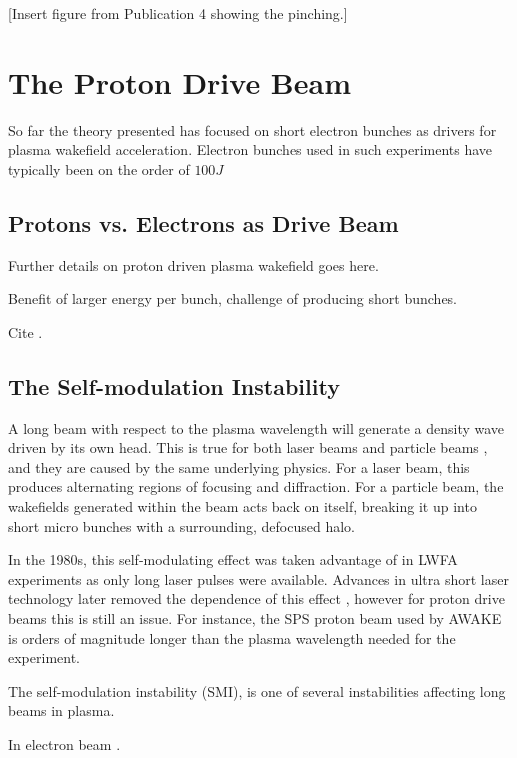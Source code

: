 [Insert figure from Publication 4 showing the pinching.]

\section{The Proton Drive Beam}
\label{Int:DBeam}

So far the theory presented has focused on short electron bunches as drivers for plasma wakefield acceleration. Electron bunches used in such experiments have typically been on the order of $100\unit{J}$

\subsection{Protons vs. Electrons as Drive Beam}
\label{Int:DBeam:PDPWFA}

Further details on proton driven plasma wakefield goes here.

Benefit of larger energy per bunch, challenge of producing short bunches.

Cite \cite{adli:2016a}.

\subsection{The Self-modulation Instability}
\label{Int:DBeam:SMI}

A long beam with respect to the plasma wavelength will generate a density wave driven by its own head. This is true for both laser beams \cite{esarey:1994} and particle beams \cite{kumar:2010}, and they are caused by the same underlying physics. For a laser beam, this produces alternating regions of focusing and diffraction. For a particle beam, the wakefields generated within the beam acts back on itself, breaking it up into short micro bunches with a surrounding, defocused halo.

In the 1980s, this self-modulating effect was taken advantage of in LWFA experiments as only long laser pulses were available. Advances in ultra short laser technology later removed the dependence of this effect \cite{pukhov:2002}, however for proton drive beams this is still an issue. For instance, the SPS proton beam used by AWAKE is orders of magnitude longer than the plasma wavelength needed for the experiment.

The self-modulation instability (SMI), is one of several instabilities affecting long beams in plasma.


In electron beam \cite{muggli:2014}.

